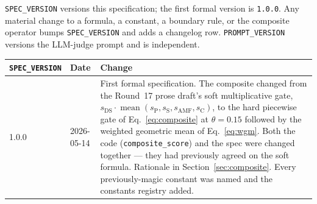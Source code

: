 \documentclass[11pt]{article}
\newcommand{\sP}{s_{\mathrm{P}}}
\newcommand{\sS}{s_{\mathrm{S}}}
\newcommand{\sAMF}{s_{\mathrm{AMF}}}
\newcommand{\sC}{s_{\mathrm{C}}}
\newcommand{\sDS}{s_{\mathrm{DS}}}
\newcommand{\code}[1]{\texttt{#1}}
\begin{document}
\texttt{SPEC\_VERSION} versions this specification; the first formal version
is \texttt{1.0.0}. Any material change to a formula, a constant, a boundary
rule, or the composite operator bumps \texttt{SPEC\_VERSION} and adds a
changelog row. \texttt{PROMPT\_VERSION} versions the LLM-judge prompt and is
independent.

\begin{center}
\begin{tabular}{p{}p{}p{}}
\toprule
\texttt{SPEC\_VERSION} & Date & Change\\
\midrule
1.0.0 & 2026-05-14 & First formal specification. The composite changed from
the Round~17 prose draft's soft multiplicative gate, $\sDS \cdot
\operatorname{mean}(\sP,\sS,\sAMF,\sC)$, to the hard piecewise gate of
Eq.~\eqref{eq:composite} at $\theta = 0.15$ followed by the weighted geometric
mean of Eq.~\eqref{eq:wgm}. Both the code (\code{composite\_score}) and the
spec were changed together --- they had previously agreed on the soft formula.
Rationale in Section~\ref{sec:composite}. Every previously-magic constant was
named and the constants registry added.\\
\bottomrule
\end{tabular}
\end{center}
\end{document}
